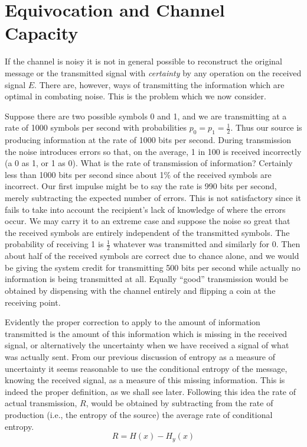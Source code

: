 \section{Equivocation and Channel Capacity}
If the channel is noisy it is not in general possible to reconstruct
the original message or the transmitted signal with \emph{certainty}
by any operation on the received signal $E$.  There are, however, ways
of transmitting the information which are optimal in combating noise.
This is the problem which we now consider.

Suppose there are two possible symbols 0 and 1, and we are transmitting
at a rate of 1000 symbols per second with probabilities $p_0 = p_1 =
\frac12$.  Thus our source is producing information at the rate of
1000 bits per second.  During transmission the noise introduces errors
so that, on the average, 1 in 100 is received incorrectly (a 0 as 1,
or 1 as 0).  What is the rate of transmission of information?  Certainly
less than 1000 bits per second since about 1\% of the received symbols
are incorrect.  Our first impulse might be to say the rate is 990 bits
per second, merely subtracting the expected number of errors.  This is
not satisfactory since it fails to take into account the recipient's
lack of knowledge of where the errors occur.  We may carry it to an
extreme case and suppose the noise so great that the received symbols
are entirely independent of the transmitted symbols.  The probability
of receiving 1 is $\frac12$ whatever was transmitted and similarly
for 0.  Then about half of the received symbols are correct due to chance
alone, and we would be giving the system credit for transmitting 500 bits
per second while actually no information is being transmitted at all.
Equally ``good'' transmission would be obtained by dispensing with the
channel entirely and flipping a coin at the receiving point.

Evidently the proper correction to apply to the amount of information
transmitted is the amount of this information which is missing in the
received signal, or alternatively the uncertainty when we have received a
signal of what was actually sent.  From our previous discussion of entropy
as a measure of uncertainty it seems reasonable to use the conditional
entropy of the message, knowing the received signal, as a measure of
this missing information.  This is indeed the proper definition, as we
shall see later.  Following this idea the rate of actual transmission,
$R$, would be obtained by subtracting from the rate of production (i.e.,
the entropy of the source) the average rate of conditional entropy.
$$
R = H(x) - H_y(x)
$$

